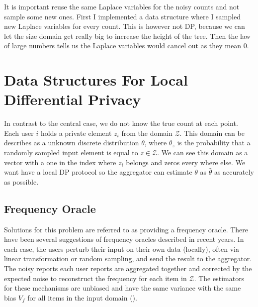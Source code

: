 \documentclass[11pt]{article}
\theoremstyle{definition}
\begin{document}
It is important reuse the same Laplace variables for the noisy counts and not sample some new ones. First I implemented a data structure where I sampled new Laplace variables for every count. This is however not DP, because we can let the size domain get really big to increase the height of the tree. Then the law of large numbers tells us the Laplace variables would cancel out as they mean $0$.

\section{Data Structures For Local Differential Privacy}
In contrast to the central case, we do not know the true count at each point.
Each user $i$ holds a private element $z_i$ from the domain $\mathcal{Z}$. This domain can be describes as a unknown discrete distribution $\theta$, where $\theta_z$ is the probability that a randomly sampled input element is equal to $z\in\mathcal{Z}$. We can see this domain as a vector with a one in the index where $z_i$ belongs and zeros every where else. We want have a local DP protocol so the aggregator can estimate $\theta$ as $\hat{\theta}$ as accurately as possible.
\subsection{Frequency Oracle}\label{freq}
Solutions for this problem are referred to as providing a frequency oracle. There have been several suggestions of frequency oracles described in recent years. In each case, the users perturb their input on their own data (locally), often via linear transformation or random sampling, and send the result to the aggregator. The noisy reports each user reports are aggregated together and corrected by the expected noise to reconstruct the frequency for each item in $\mathcal{Z}$. The estimators for these mechanisms are unbiased and have the same variance with the same bias $V_f$ for all items in the input domain (\cite[3]{local}). \\
\end{document}
